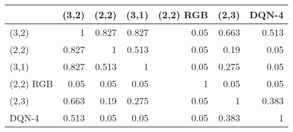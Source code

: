\begin{tabular}{lrrrrrr}
\hline
           &   (3,2) &   (2,2) &   (3,1) &   (2,2) RGB &   (2,3) &   DQN-4 \\
\hline
 (3,2)     &   1     &   0.827 &   0.827 &        0.05 &   0.663 &   0.513 \\
 (2,2)     &   0.827 &   1     &   0.513 &        0.05 &   0.19  &   0.05  \\
 (3,1)     &   0.827 &   0.513 &   1     &        0.05 &   0.275 &   0.05  \\
 (2,2) RGB &   0.05  &   0.05  &   0.05  &        1    &   0.05  &   0.05  \\
 (2,3)     &   0.663 &   0.19  &   0.275 &        0.05 &   1     &   0.383 \\
 DQN-4     &   0.513 &   0.05  &   0.05  &        0.05 &   0.383 &   1     \\
\hline
\end{tabular}